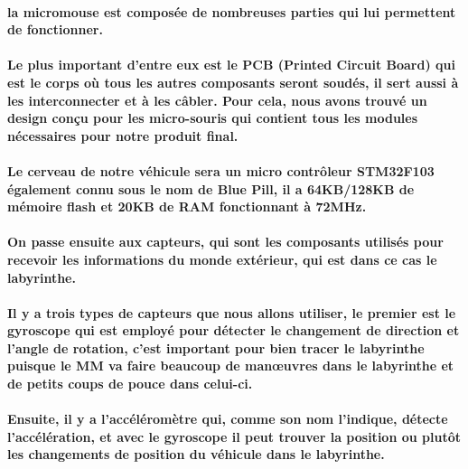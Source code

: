\paragraph{
	la micromouse est composée de nombreuses parties qui lui permettent de fonctionner.
}

\paragraph{
	Le plus important d'entre eux est le PCB (Printed Circuit Board) qui est le corps 
où tous les autres composants seront soudés, il sert aussi à les interconnecter et 
à les câbler. Pour cela, nous avons trouvé un design conçu pour les micro-souris 
qui contient tous les modules nécessaires pour notre produit final.
}


\paragraph{
	Le cerveau de notre véhicule sera un micro contrôleur STM32F103 également connu 
sous le nom de Blue Pill, il a 64KB/128KB de mémoire flash et 20KB de RAM fonctionnant 
à 72MHz.
}

\paragraph{
	On passe ensuite aux capteurs, qui sont les composants utilisés pour recevoir les 
informations du monde extérieur, qui est dans ce cas le labyrinthe.
}

\paragraph{
	Il y a trois types de capteurs que nous allons utiliser, le premier est le gyroscope 
qui est employé pour détecter le changement de direction et l'angle de rotation, 
c'est important pour bien tracer le labyrinthe puisque le MM va faire beaucoup de 
manœuvres dans le labyrinthe et de petits coups de pouce dans celui-ci.
}

\paragraph{
	Ensuite, il y a l'accéléromètre qui, comme son nom l'indique, détecte l'accélération, 
et avec le gyroscope il peut trouver la position ou plutôt les changements de position 
du véhicule dans le labyrinthe. 
}

